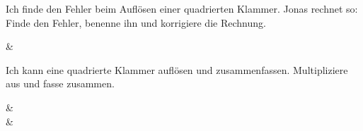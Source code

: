 \begin{aufgabe}{Ich finde den Fehler beim Auflösen einer quadrierten Klammer.}
Jonas rechnet so:
Finde den Fehler, benenne ihn und korrigiere die Rechnung.
\begin{gleichungsraster}[3]
 & \\
\end{gleichungsraster}
\end{aufgabe}

\begin{aufgabe}{Ich kann eine quadrierte Klammer auflösen und zusammenfassen.}
Multipliziere aus und fasse zusammen.
\begin{gleichungsraster}[2]
 &  \\
 & \\
\end{gleichungsraster}
\end{aufgabe}
